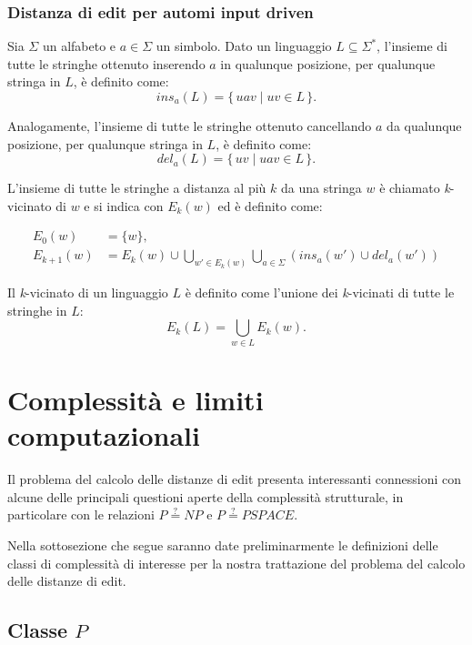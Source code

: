 \documentclass[a4paper,12pt]{report}
\theoremstyle{propositionstyle}
\begin{document}
    \subsubsection{Distanza di edit per automi input driven}

    Sia $\Sigma$ un alfabeto e $a \in \Sigma$ un simbolo.
    Dato un linguaggio $L \subseteq \Sigma^*$, l'insieme di tutte le stringhe ottenuto inserendo $a$ in qualunque posizione, per qualunque stringa in $L$, è definito come:
    \[
        ins_a(L) = \{\, u a v \mid u v \in L \,\}.
    \]

    Analogamente, l'insieme di tutte le stringhe ottenuto cancellando $a$ da qualunque posizione, per qualunque stringa in $L$, è definito come:
    \[
        del_a(L) = \{\, u v \mid u a v \in L \,\}.
    \]

    L'insieme di tutte le stringhe a distanza al più $k$ da una stringa $w$ è chiamato \textit{k}-vicinato di $w$ e si indica con $E_k(w)$ ed è definito come:

    \begin{align*}
        E_0(w) &= \{w\}, \\
        E_{k+1}(w) &= E_k(w) \cup \bigcup_{w' \in E_k\left(w\right)} \bigcup_{a \in \Sigma} \left(ins_a(w') \cup del_a(w')\right)
    \end{align*}

    Il \textit{k}-vicinato di un linguaggio $L$ è definito come l'unione dei \textit{k}-vicinati di tutte le stringhe in $L$:
    \[
        E_k(L) = \bigcup_{w \in L} E_k(w).
    \]


    \section{Complessità e limiti computazionali}

    Il problema del calcolo delle distanze di edit presenta interessanti connessioni con alcune delle principali questioni aperte della complessità strutturale, in particolare con le relazioni $P \stackrel{?}{=} NP$ e $P \stackrel{?}{=} PSPACE$.

    Nella sottosezione che segue saranno date preliminarmente le definizioni delle classi di complessità di interesse per la nostra trattazione del problema del calcolo delle distanze di edit.

    \subsection{Classe $P$}
\end{document}
